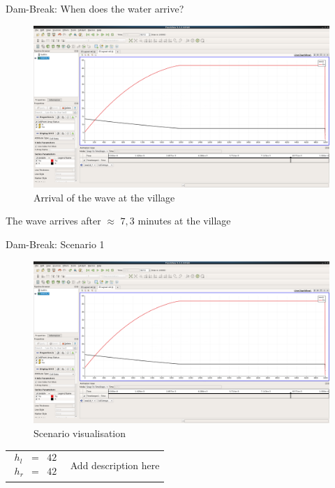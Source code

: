 \documentclass[shortpres]{beamer}
\newcommand{\imgvoffset}{-20pt}
\newcommand{\imgfullscale}{0.75}
\begin{document}
\begin{frame}{Dam-Break: When does the water arrive?}
	\begin{figure}[t]
		\vspace{\imgvoffset}
		\includegraphics[width=\imgfullscale\linewidth]{img/4_dorf_arrival_as_graph.png}
		\caption*{Arrival of the wave at the village}
	\end{figure}
	The wave arrives after $\approx$ $7,3$ minutes at the village
\end{frame}

\begin{frame}{Dam-Break: Scenario 1}
	\begin{figure}[t]
		\vspace{\imgvoffset}
		\includegraphics[width=\imgfullscale\linewidth]{img/4_dorf_arrival_as_graph.png}
		\caption*{Scenario visualisation}
	\end{figure}
	
	\begin{tabular}{m{3cm} m{\linewidth-5cm}}
		$
		\begin{matrix}
		h_l & = & 42\\
		h_r & = & 42
		\end{matrix}
		$
		&
		Add description here
	\end{tabular}
\end{frame}
\end{document}
